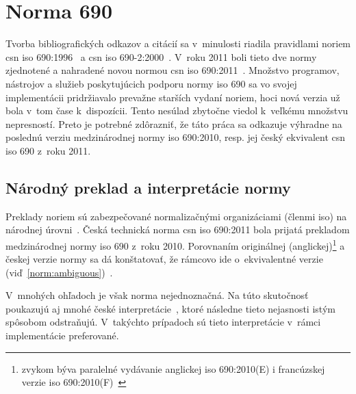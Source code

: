 \documentclass[
  color,
  table,
  nolof,
  oneside,
]{fithesis3}
\begin{document}



\chapter{Norma  690}\label{ch:norm}

Tvorba bibliografických odkazov a citácií sa v~minulosti riadila pravidlami noriem \gls{csn} \gls{iso} 690:1996~\cite{csn:iso690:1996} a \gls{csn} \gls{iso} 690-2:2000~\cite{csn:iso690:2:2000}. V~roku 2011 boli tieto dve normy zjednotené a nahradené novou normou \gls{csn} \gls{iso} 690:2011~\cite{csn:iso690:2011}. Množstvo programov, nástrojov a služieb poskytujúcich podporu normy \gls{iso} 690 sa vo svojej implementácii pridržiavalo prevažne starších vydaní noriem, hoci nová verzia už bola v~tom čase k~dispozícii. Tento nesúlad zbytočne viedol k~veľkému množstvu nepresností. Preto je potrebné zdôrazniť, že táto práca sa odkazuje výhradne na poslednú verziu medzinárodnej normy \gls{iso} 690:2010, resp. jej český ekvivalent \gls{csn} \gls{iso} 690 z~roku 2011.

\section{Národný preklad a interpretácie normy}

Preklady noriem sú zabezpečované normalizačnými organizáciami (členmi \gls{iso}) na národnej úrovni~\cite{isoMembershipManual}. Česká technická norma \gls{csn} \gls{iso} 690:2011 bola prijatá prekladom medzinárodnej normy \gls{iso} 690 z~roku 2010. Porovnaním originálnej (anglickej)\footnote{zvykom býva paralelné vydávanie anglickej \gls{iso} 690:2010(E) i francúzskej verzie \gls{iso} 690:2010(F)~\cite{Bratkova2010}} a českej verzie normy sa dá konštatovať, že rámcovo ide o~ekvivalentné verzie (viď~\ref{norm:ambiguous})~\cite{csn:iso690:2011,iso690:2010}.

V~mnohých ohľadoch je však norma nejednoznačná. Na túto skutočnosť poukazujú aj mnohé české interpretácie~\cite{Kratochvil2011,Biernatova2011,Bratkova2011}, ktoré následne tieto nejasnosti istým spôsobom odstraňujú. V~takýchto prípadoch sú tieto interpretácie v~rámci implementácie preferované.
\end{document}
